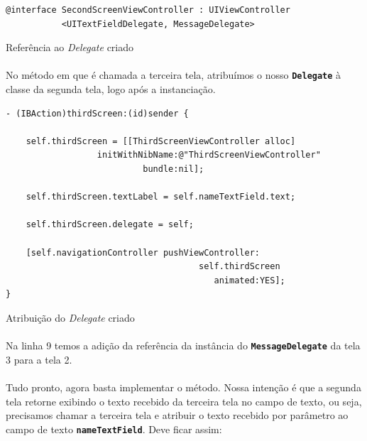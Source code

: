 \documentclass[a4paper,12pt,brazil,doubleside]{book}
\begin{document}
\begin{singlespace}
\begin{listing}[H]
\begin{verbatim}
@interface SecondScreenViewController : UIViewController
           <UITextFieldDelegate, MessageDelegate>
\end{verbatim}
\caption{Referência ao \emph{Delegate} criado}
\end{listing}

\paragraph{}No método em que é chamada a terceira tela, atribuímos o nosso \texttt{\textbf{Delegate}} à classe da segunda tela, logo após a instanciação.

\begin{listing}[H]
\begin{verbatim}
- (IBAction)thirdScreen:(id)sender {
    
    self.thirdScreen = [[ThirdScreenViewController alloc]
                  initWithNibName:@"ThirdScreenViewController"
                           bundle:nil];
    
    self.thirdScreen.textLabel = self.nameTextField.text;
    
    self.thirdScreen.delegate = self;
    
    [self.navigationController pushViewController:
                                      self.thirdScreen
                                         animated:YES];
}
\end{verbatim}
\caption{Atribuição do \emph{Delegate} criado}
\end{listing}

\paragraph{}Na linha 9 temos a adição da referência da instância do \texttt{\textbf{MessageDelegate}} da tela 3 para a tela 2.
\paragraph{}Tudo pronto, agora basta implementar o método. Nossa intenção é que a segunda tela retorne exibindo o texto recebido da terceira tela no campo de texto, ou seja, precisamos chamar a terceira tela e atribuir o texto recebido por parâmetro ao campo de texto \texttt{\textbf{nameTextField}}. Deve ficar assim:


\end{singlespace}
\end{document}
